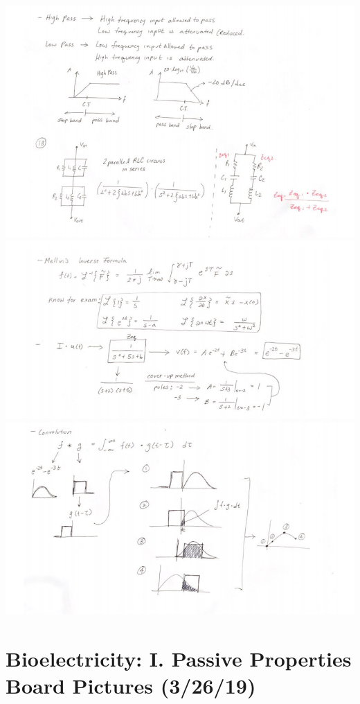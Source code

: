 \documentclass[11pt]{book}
\begin{document}
\\
\includegraphics[width=\textwidth]{figures/3-19_Board5.png}
\\
\includegraphics[width=\textwidth]{figures/3-19_Board6.png}
\\
\includegraphics[width=\textwidth]{figures/3-19_Board7.png}

\section{Bioelectricity: I. Passive Properties Board Pictures (3/26/19)}
\end{document}
